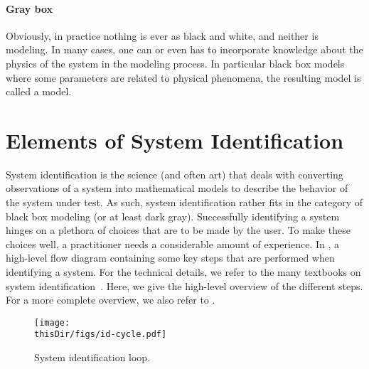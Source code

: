 \paragraph{Gray box}
Obviously, in practice nothing is ever as black and white, and neither is modeling.
In many cases, one can or even has to incorporate knowledge about the physics of the system in the modeling process.
In particular black box models where some parameters are related to physical phenomena, the resulting model is called a  model.


\section{Elements of System Identification}
System identification is the science (and often art) that deals with converting observations of a system into mathematical models to describe the behavior of the system under test.
As such, system identification rather fits in the category of black box modeling (or at least dark gray).
Successfully identifying a system hinges on a plethora of choices that are to be made by the user.
To make these choices well, a practitioner needs a considerable amount of experience. 
In , a high-level flow diagram containing some key steps that are performed when identifying a system.
For the technical details, we refer to the many textbooks on system identification~\citep{Keesman2011,Norton1986,Soderstrom1989,Ljung1999,Pintelon2012}.
Here, we give the high-level overview of the different steps.
For a more complete overview, we also refer to \citet{Ljung2010}.

\begin{figure}
  \centering
  \texttt{[image: \\thisDir/figs/id-cycle.pdf]}
  \caption[System identification loop]{System identification loop. }
  \label{fig:intro:identification-cycle}
\end{figure}

